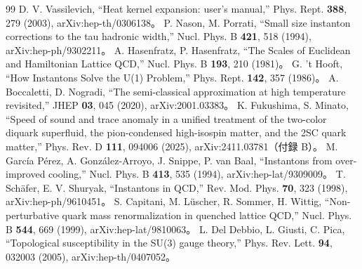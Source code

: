 \documentclass[a4paper,10pt]{ltjsarticle}
\begin{document}
\begin{thebibliography}{99}
 D. V. Vassilevich, ``Heat kernel expansion: user's manual,'' Phys. Rept. \textbf{388}, 279 (2003), arXiv:hep-th/0306138。
 P. Nason, M. Porrati, ``Small size instanton corrections to the tau hadronic width,'' Nucl. Phys. B \textbf{421}, 518 (1994), arXiv:hep-ph/9302211。
 A. Hasenfratz, P. Hasenfratz, ``The Scales of Euclidean and Hamiltonian Lattice QCD,'' Nucl. Phys. B \textbf{193}, 210 (1981)。
 G. 't Hooft, ``How Instantons Solve the U(1) Problem,'' Phys. Rept. \textbf{142}, 357 (1986)。
 A. Boccaletti, D. Nogradi, ``The semi-classical approximation at high temperature revisited,'' JHEP \textbf{03}, 045 (2020), arXiv:2001.03383。
 K. Fukushima, S. Minato, ``Speed of sound and trace anomaly in a unified treatment of the two-color diquark superfluid, the pion-condensed high-isospin matter, and the 2SC quark matter,'' Phys. Rev. D \textbf{111}, 094006 (2025), arXiv:2411.03781（付録 B）。
 M. García Pérez, A. González-Arroyo, J. Snippe, P. van Baal, ``Instantons from over-improved cooling,'' Nucl. Phys. B \textbf{413}, 535 (1994), arXiv:hep-lat/9309009。
 T. Schäfer, E. V. Shuryak, ``Instantons in QCD,'' Rev. Mod. Phys. \textbf{70}, 323 (1998), arXiv:hep-ph/9610451。
 S. Capitani, M. Lüscher, R. Sommer, H. Wittig, ``Non-perturbative quark mass renormalization in quenched lattice QCD,'' Nucl. Phys. B \textbf{544}, 669 (1999), arXiv:hep-lat/9810063。
 L. Del Debbio, L. Giusti, C. Pica, ``Topological susceptibility in the SU(3) gauge theory,'' Phys. Rev. Lett. \textbf{94}, 032003 (2005), arXiv:hep-th/0407052。
\end{thebibliography}
\end{document}
